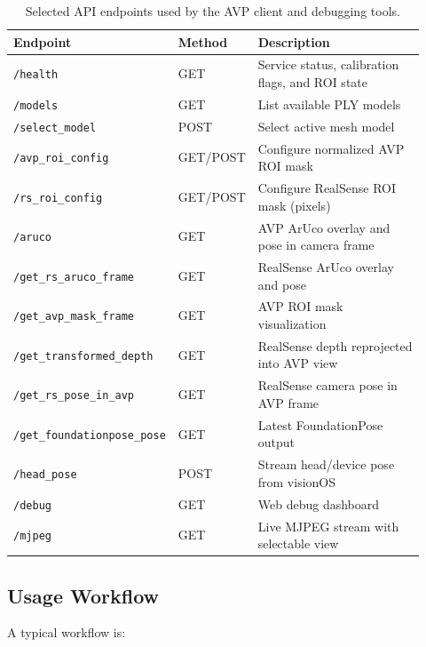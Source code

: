 \documentclass[11pt]{article}
\begin{document}
\begin{table}[H]
\centering
\caption{Selected API endpoints used by the AVP client and debugging tools.}
\label{tab:api_endpoints}
\begin{tabular}{p{0.30\linewidth}p{0.12\linewidth}p{0.50\linewidth}}
    \toprule
    \textbf{Endpoint} & \textbf{Method} & \textbf{Description} \\
    \midrule
    \texttt{/health} & GET & Service status, calibration flags, and ROI state \\
    \texttt{/models} & GET & List available PLY models \\
    \texttt{/select\_model} & POST & Select active mesh model \\
    \texttt{/avp\_roi\_config} & GET/POST & Configure normalized AVP ROI mask \\
    \texttt{/rs\_roi\_config} & GET/POST & Configure RealSense ROI mask (pixels) \\
    \texttt{/aruco} & GET & AVP ArUco overlay and pose in camera frame \\
    \texttt{/get\_rs\_aruco\_frame} & GET & RealSense ArUco overlay and pose \\
    \texttt{/get\_avp\_mask\_frame} & GET & AVP ROI mask visualization \\
    \texttt{/get\_transformed\_depth} & GET & RealSense depth reprojected into AVP view \\
    \texttt{/get\_rs\_pose\_in\_avp} & GET & RealSense camera pose in AVP frame \\
    \texttt{/get\_foundationpose\_pose} & GET & Latest FoundationPose output \\
    \texttt{/head\_pose} & POST & Stream head/device pose from visionOS \\
    \texttt{/debug} & GET & Web debug dashboard \\
    \texttt{/mjpeg} & GET & Live MJPEG stream with selectable view \\
    \bottomrule
\end{tabular}
\end{table}

\subsection{Usage Workflow}

A typical workflow is:
\end{document}
